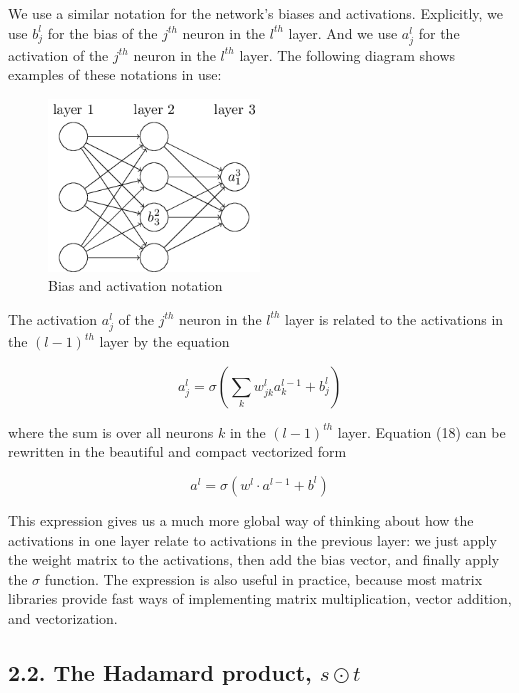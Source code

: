 \documentclass[12 pt]{article}
\begin{document}
We use a similar notation for the network's biases and activations.
Explicitly, we use $ b^l_j $ for the bias of the $ j^{th} $
neuron in the $ l^{th} $ layer. And we use $ a^l_j $ for
the activation of the $ j^{th} $ neuron in the $ l^{th} $
layer. The following diagram shows examples of these notations in use:

\begin{figure}[htbp]
\centering
\includegraphics[width=0.5\textwidth]{./figs/tikz17.png}
\caption{Bias and activation notation}
\end{figure}

The activation $ a^l_j $ of the $ j^{th} $ neuron in the
$ l^{th} $ layer is related to the activations in the
$ (l - 1)^{th} $ layer by the equation

\begin{equation}
    a^l_j = \sigma(\sum_k w^l_{jk} a^{l-1}_k + b^l_j)
\end{equation}

where the sum is over all neurons $ k $ in the $ (l - 1)^{th} $
layer. Equation (18) can be rewritten in the beautiful and compact
vectorized form

\begin{equation}
    a^l = \sigma(w^l \cdot a^{l-1} + b^l)
\end{equation}

This expression gives us a much more global way of thinking about how
the activations in one layer relate to activations in the previous
layer: we just apply the weight matrix to the activations, then add the
bias vector, and finally apply the $ \sigma $ function. The expression is
also useful in practice, because most matrix libraries provide fast ways
of implementing matrix multiplication, vector addition, and
vectorization.

\subsection{2.2. The Hadamard product, $ s \odot t $}
\label{the-hadamard-product-s-t}
\end{document}
